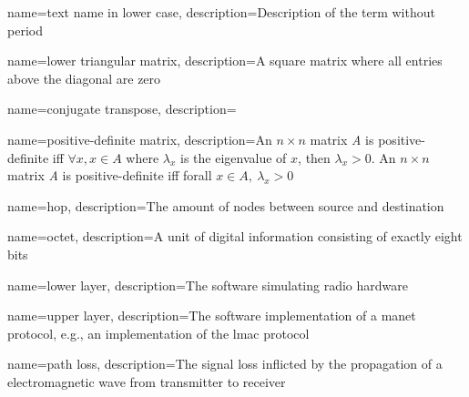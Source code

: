 \makenoidxglossaries
{}




{
    name={text name in lower case},
    description={Description of the term without period}
}

{
    name={lower triangular matrix},
    description={A square matrix where all entries above the diagonal are zero}
}

{
    name={conjugate transpose},
    description={}
}

{
    name={positive-definite matrix},
    description={An $n \times n$ matrix \textit{A} is positive-definite iff $\forall x, x \in A$ where $\lambda_x$ is the eigenvalue of $x$, then $\lambda_x > 0$. 
    An $n \times n$ matrix \textit{A} is positive-definite iff forall $x \in A,\ \lambda_x > 0$}
}

{
    name={hop},
    description={The amount of nodes between source and destination}
}

{
    name={octet},
    description={A unit of digital information consisting of exactly eight bits}
}

{
    name={lower layer},
    description={The software simulating radio hardware}
}

{
    name={upper layer},
    description={The software implementation of a \acrshort{manet} protocol, e.g., an implementation of the \acrshort{lmac} protocol}
}

{
    name={path loss},
    description={The signal loss inflicted by the propagation of a electromagnetic wave from transmitter to receiver~\cite[p.~10]{paper:linkmodel}}
}